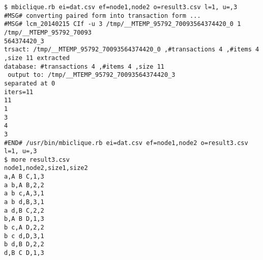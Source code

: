 \begin{Verbatim}[baselinestretch=0.7,frame=single]
$ mbiclique.rb ei=dat.csv ef=node1,node2 o=result3.csv l=1, u=,3
#MSG# converting paired form into transaction form ...
#MSG# lcm_20140215 CIf -u 3 /tmp/__MTEMP_95792_70093564374420_0 1 /tmp/__MTEMP_95792_70093
564374420_3
trsact: /tmp/__MTEMP_95792_70093564374420_0 ,#transactions 4 ,#items 4 ,size 11 extracted 
database: #transactions 4 ,#items 4 ,size 11
 output to: /tmp/__MTEMP_95792_70093564374420_3
separated at 0
iters=11
11
1
3
4
3
#END# /usr/bin/mbiclique.rb ei=dat.csv ef=node1,node2 o=result3.csv l=1, u=,3
$ more result3.csv
node1,node2,size1,size2
a,A B C,1,3
a b,A B,2,2
a b c,A,3,1
a b d,B,3,1
a d,B C,2,2
b,A B D,1,3
b c,A D,2,2
b c d,D,3,1
b d,B D,2,2
d,B C D,1,3
\end{Verbatim}
